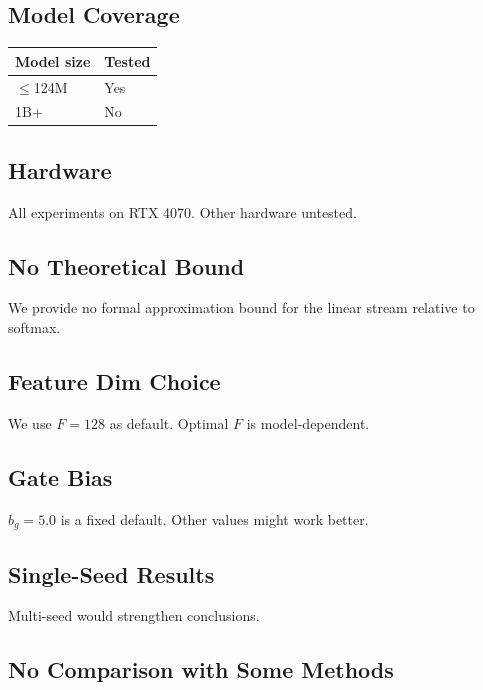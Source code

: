 \subsection{Model Coverage}

\begin{table}[H]
\centering
\small
\begin{tabular}{ll}
\toprule
\textbf{Model size} & \textbf{Tested} \\
\midrule
$\le$124M & Yes \\
1B+ & No \\
\bottomrule
\end{tabular}
\end{table}

\subsection{Hardware}

All experiments on RTX 4070. Other hardware untested.

\subsection{No Theoretical Bound}

We provide no formal approximation bound for the linear stream relative to 
softmax.

\subsection{Feature Dim Choice}

We use $F = 128$ as default. Optimal $F$ is model-dependent.

\subsection{Gate Bias}

$b_g = 5.0$ is a fixed default. Other values might work 
better.

\subsection{Single-Seed Results}

Multi-seed would strengthen conclusions.

\subsection{No Comparison with Some Methods}


